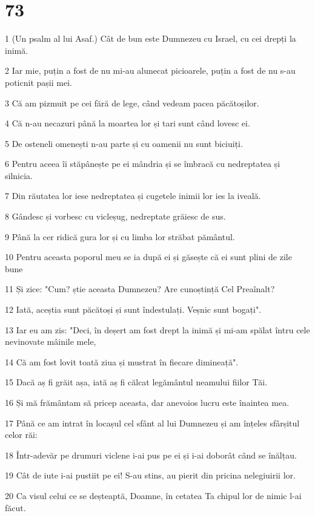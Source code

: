 \chapter{73}

\par 1 (Un psalm al lui Asaf.) Cât de bun este Dumnezeu cu Israel, cu cei drepți la inimă.
\par 2 Iar mie, puțin a fost de nu mi-au alunecat picioarele, puțin a fost de nu s-au poticnit pașii mei.
\par 3 Că am pizmuit pe cei fără de lege, când vedeam pacea păcătoșilor.
\par 4 Că n-au necazuri până la moartea lor și tari sunt când lovesc ei.
\par 5 De osteneli omenești n-au parte și cu oamenii nu sunt biciuiți.
\par 6 Pentru aceea îi stăpânește pe ei mândria și se îmbracă cu nedreptatea și silnicia.
\par 7 Din răutatea lor iese nedreptatea și cugetele inimii lor ies la iveală.
\par 8 Gândesc și vorbesc cu vicleșug, nedreptate grăiesc de sus.
\par 9 Până la cer ridică gura lor și cu limba lor străbat pământul.
\par 10 Pentru aceasta poporul meu se ia după ei și găsește că ei sunt plini de zile bune
\par 11 Și zice: "Cum? știe aceasta Dumnezeu? Are cunoștință Cel Preaînalt?
\par 12 Iată, aceștia sunt păcătoși și sunt îndestulați. Veșnic sunt bogați".
\par 13 Iar eu am zis: "Deci, în deșert am fost drept la inimă și mi-am spălat întru cele nevinovate mâinile mele,
\par 14 Că am fost lovit toată ziua și mustrat în fiecare dimineață".
\par 15 Dacă aș fi grăit așa, iată aș fi călcat legământul neamului fiilor Tăi.
\par 16 Și mă frământam să pricep aceasta, dar anevoios lucru este înaintea mea.
\par 17 Până ce am intrat în locașul cel sfânt al lui Dumnezeu și am înțeles sfârșitul celor răi:
\par 18 Într-adevăr pe drumuri viclene i-ai pus pe ei și i-ai doborât când se înălțau.
\par 19 Cât de iute i-ai pustiit pe ei! S-au stins, au pierit din pricina nelegiuirii lor.
\par 20 Ca visul celui ce se deșteaptă, Doamne, în cetatea Ta chipul lor de nimic l-ai făcut.
